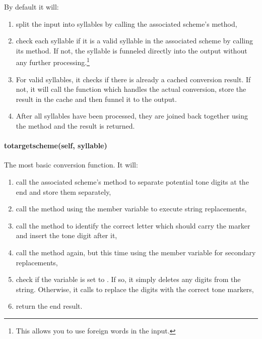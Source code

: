\documentclass{ltxdockit}
\begin{document}
By default it will:

\begin{enumerate}
  \item split the input into syllables by calling the associated 
    scheme's  method,
  \item check each syllable if it is a valid syllable in the associated
     scheme by calling its
     method. If not, the
    syllable is funneled directly into the output without any further
    processing.\footnote{This allows you to use foreign words in the input.}
  \item For valid syllables, it checks if there is already a cached conversion
    result. If not, it will call the
     function which
    handles the actual conversion, store the result in the cache and then funnel
    it to the output.
  \item After all syllables have been processed, they are joined back together
    using the  method and the result is returned.
\end{enumerate}

\paragraph{to\textunderscore{}target\textunderscore{}scheme(self, syllable)}

The most basic conversion function. It will:

\begin{enumerate}
  \item call the associated  scheme's
     method
    to separate potential tone digits at the end and store them separately,
  \item call the  method using
    the  member variable to execute string
    replacements,
  \item call the  method
    to identify the correct letter which should carry the marker and insert the
    tone digit after it,
  \item call the  method
    again, but this time using the
     member variable for
    secondary replacements,
  \item check if the  variable is set to
    . If so, it simply deletes any digits from the string. Otherwise,
    it calls  to replace
    the digits with the correct tone markers,
  \item return the end result.
\end{enumerate}
\end{document}
